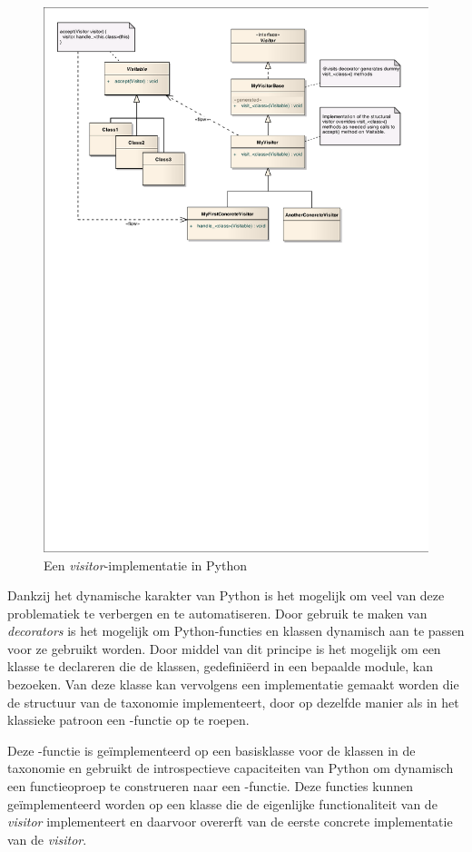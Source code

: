 \begin{figure}[ht]
  \centering
  \includegraphics[width=0.9\linewidth]{resources/py-visitor.pdf}
  \caption{Een \emph{visitor}-implementatie in Python}
  \label{fig:py-visitor}
\end{figure}

Dankzij het dynamische karakter van Python is het mogelijk om veel van deze
problematiek te verbergen en te automatiseren. Door gebruik te maken van
\emph{decorators} is het mogelijk om Python-functies en klassen dynamisch aan
te passen voor ze gebruikt worden. Door middel van dit principe is het mogelijk
om een klasse te declareren die de klassen, gedefini\"eerd in een bepaalde
module, kan bezoeken. Van deze klasse kan vervolgens een implementatie gemaakt
worden die de structuur van de taxonomie implementeert, door op dezelfde manier
als in het klassieke patroon een -functie op te roepen.

Deze -functie is ge\"implementeerd op een basisklasse voor de
klassen in de taxonomie en gebruikt de introspectieve capaciteiten van Python
om dynamisch een functieoproep te construeren naar een
-functie. Deze functies kunnen ge\"implementeerd worden op
een klasse die de eigenlijke functionaliteit van de \emph{visitor}
implementeert en daarvoor overerft van de eerste concrete implementatie van de
\emph{visitor}.

